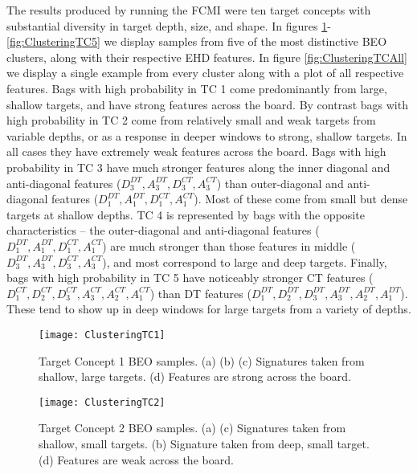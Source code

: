 \documentclass[12pt,dvips]{report}
\numberwithin{equation}{section}
\begin{document}
The results produced by running the FCMI were ten target concepts with substantial diversity in target depth, size, and shape.  In figures \ref{fig:ClusteringTC1}-\ref{fig:ClusteringTC5} we display samples from five of the most distinctive BEO clusters, along with their respective EHD features.  In figure \ref{fig:ClusteringTCAll} we display a single example from every cluster along with a plot of all respective features.  Bags with high probability in TC 1 come predominantly from large, shallow targets, and have strong features across the board.  By contrast bags with high probability in TC 2 come from relatively small and weak targets from variable depths, or as a response in deeper windows to strong, shallow targets.  In all cases they have extremely weak features across the board.  Bags with high probability in TC 3 have much stronger features along the inner diagonal and anti-diagonal features ($D^{DT}_3, A^{DT}_3, D^{CT}_3, A^{CT}_3$) than outer-diagonal and anti-diagonal features ($D^{DT}_1, A^{DT}_1, D^{CT}_1, A^{CT}_1$).  Most of these come from small but dense targets at shallow depths.  TC 4 is represented by bags with the opposite characteristics -- the outer-diagonal and anti-diagonal features ($D^{DT}_1, A^{DT}_1, D^{CT}_1, A^{CT}_1$) are much stronger than those features in  middle ($D^{DT}_3, A^{DT}_3, D^{CT}_3, A^{CT}_3$), and most correspond to large and deep targets.  Finally, bags with high probability in TC 5 have noticeably stronger CT features ($D^{CT}_1, D^{CT}_2, D^{CT}_3, A^{CT}_3, A^{CT}_2, A^{CT}_1$) than DT features ($D^{DT}_1, D^{DT}_2, D^{DT}_3, A^{DT}_3, A^{DT}_2, A^{DT}_1$).  These tend to show up in deep windows for large targets from a variety of depths.

\begin{figure}[htb]\texttt{[image: ClusteringTC1]}
\caption{Target Concept 1 BEO samples. (a) (b) (c) Signatures taken from shallow, large targets. (d) Features are strong across the board.}
\label{fig:ClusteringTC1}

\end{figure}

\begin{figure}[htb]\texttt{[image: ClusteringTC2]}
\caption{Target Concept 2 BEO samples. (a) (c) Signatures taken from shallow, small targets.  (b) Signature taken from deep, small target. (d) Features are weak across the board.}
\label{fig:ClusteringTC2}

\end{figure}
\end{document}
